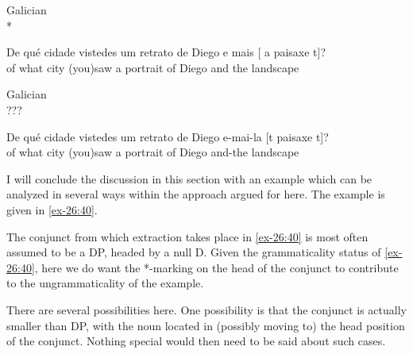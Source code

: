 \documentclass[output=paper]{langsci/langscibook}
\begin{document}
\ea\label{ex-26:38}Galician\\
    * \parbox[t]{10cm}{\gll De qué cidade vistedes um retrato de Diego e mais [ a  paisaxe t]?\\
     of what city (you)saw a portrait of Diego and {} {} the landscape\\}
\ex\label{ex-26:39}Galician\\
   ??? \parbox[t]{10cm}{\gll De qué cidade vistedes um retrato de Diego e-mai-la [t paisaxe t]?\\
      of what city (you)saw a portrait of Diego and-the {}  landscape\\}
\z

I will conclude the discussion in this section with an example which can be
analyzed in several ways within the approach argued for here. The example is
given in \eqref{ex-26:40}.

\label{ex-26:40}
\z

The conjunct from which extraction takes place in \eqref{ex-26:40} is most often assumed to
be a DP, headed by a null D. Given the grammaticality status of \eqref{ex-26:40}, here we
do want the *-marking on the head of the conjunct to contribute to the
ungrammaticality of the example.

There are several possibilities here. One possibility is that the conjunct is
actually smaller than DP, with the noun located in (possibly moving to) the
head position of the conjunct. Nothing special would then need to be said about
such cases.
\end{document}
